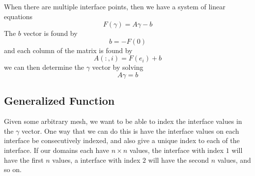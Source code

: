\documentclass[12pt]{article}
\begin{document}
When there are multiple interface points, then we have a system of linear equations
\begin{equation}
F(\gamma)=A\gamma-b
\end{equation}
The $b$ vector is found by
\begin{equation}
b=-F(0)
    \label{bvec}
\end{equation}
and each column of the matrix is found by
\begin{equation}
A(:,i) = F(e_i)+b
    \label{matrixcol}
\end{equation}
we can then determine the  $\gamma$ vector by solving
\begin{equation}
A\gamma=b
\end{equation}
\subsection{Generalized Function}
Given some arbitrary mesh, we want to be able to index the interface values in the $\gamma$ vector.
One way that we can do this is have the interface values on each interface be consecutively indexed,
and also give a unique index to each of the interface. If our domains each have $n \times n$ values,
the interface with index $1$ will have the first $n$ values, a interface with index $2$ will have
the second $n$ values, and so on.
\end{document}
